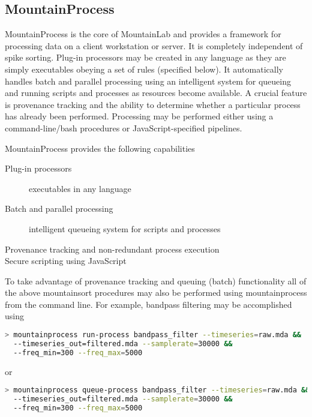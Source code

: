 \documentclass{article}
\begin{document}
\subsection{MountainProcess}

MountainProcess is the core of MountainLab and provides a framework for processing data on a client workstation or server. It is completely independent of spike sorting. Plug-in processors may be created in any language as they are simply executables obeying a set of rules (specified below). It automatically handles batch and parallel processing using an intelligent system for queueing and running scripts and processes as resources become available. A crucial feature is provenance tracking and the ability to determine whether a particular process has already been performed. Processing may be performed either using a command-line/bash procedures or JavaScript-specified pipelines.

MountainProcess provides the following capabilities
\begin{description}
\item[Plug-in processors] executables in any language
\item[Batch and parallel processing] intelligent queueing system for scripts and processes
\item[Provenance tracking and non-redundant process execution]
\item[Secure scripting using JavaScript]
\end{description}

To take advantage of provenance tracking and queuing (batch) functionality all of the above mountainsort procedures may also be performed using mountainprocess from the command line. For example, bandpass filtering may be accomplished using
\begin{lstlisting}[language=bash]
> mountainprocess run-process bandpass_filter --timeseries=raw.mda &&
  --timeseries_out=filtered.mda --samplerate=30000 &&
  --freq_min=300 --freq_max=5000
\end{lstlisting}
or
\begin{lstlisting}[language=bash]
> mountainprocess queue-process bandpass_filter --timeseries=raw.mda &&
  --timeseries_out=filtered.mda --samplerate=30000 &&
  --freq_min=300 --freq_max=5000
\end{lstlisting}
\end{document}
